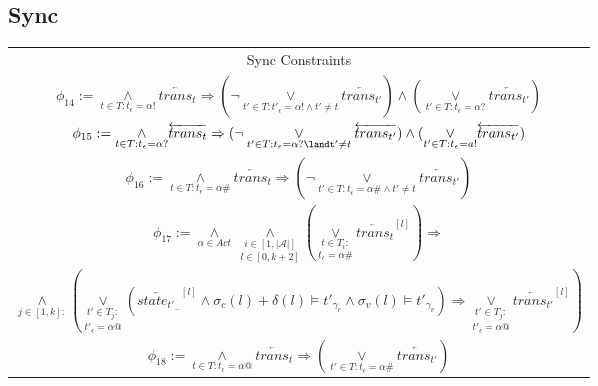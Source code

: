 \documentclass[a4paper,12pt]{article}
\begin{document}
\subsection{Sync}
\label{sec:orgf40352d}
\begin{center}
\begin{tabular}{c}
Sync Constraints \\
\(\phi_{14} := \underset{t \in T: t_\epsilon = \alpha!}{\land} \overleftarrow{trans_t} \Rightarrow (\neg \underset{t' \in T: t'_\epsilon = \alpha!\land t'\neq t}{\lor} \overleftarrow{trans_{t'}}) \land (\underset{t' \in T: t_\epsilon = \alpha?}{\lor} \overleftarrow{trans_{t'}})\) \\
\midrule
\(\phi_{15} := \underset{t \in T: t_\epsilon = \alpha?}{\land} \overleftarrow{trans_t} \Rightarrow (\neg \underset{t' \in T:t_\epsilon = \alpha?\landt'\neq t}{\lor} \overleftarrow{trans_{t'}}) \land (\underset{t' \in T:t_\epsilon = a!}{\lor} \overleftarrow{trans_{t'}})\) \\
\midrule
\(\phi_{16} := \underset{t \in T:t_\epsilon = \alpha\#}{\land} \overleftarrow{trans_t} \Rightarrow (\neg \underset{t' \in T:t_\epsilon = \alpha\#\land t' \neq t}{\lor} \overleftarrow{trans_{t'}}) \) \\
\midrule
\(\phi_{17} := \underset{\alpha \in Act}{\land}\ \underset{l \in [0,k+2]}{\underset{i \in [1,|\mathcal{A}|]}{\land}} (\underset{t_\epsilon = \alpha\#}{\underset{t \in T_i:}{\lor}} \overleftarrow{trans_t}^{[l]}) \Rightarrow \) \\
\(\underset{}{\underset{j \in [1,k]:}{\land}} (\underset{t'_\epsilon = \alpha@}{\underset{t' \in T_j: }{\lor}} (\overleftarrow{state_{t'_-}}^{[l]} \land \sigma_c(l) + \delta(l) \vDash t'_{\gamma_c} \land \sigma_v(l) \vDash t'_{\gamma_v}) \Rightarrow \underset{t'_\epsilon = \alpha@}{\underset{t' \in T_j:}{\lor}} \overleftarrow{trans_{t'}}^{[l]}) \) \\
\midrule
\(\phi_{18} := \underset{t \in T:t_\epsilon = \alpha@}{\land} \overleftarrow{trans_t} \Rightarrow (\underset{t' \in T: t_\epsilon = \alpha\#}{\lor} \overleftarrow{trans_{t'}}) \) \\

\end{tabular}
\end{center}
\end{document}
